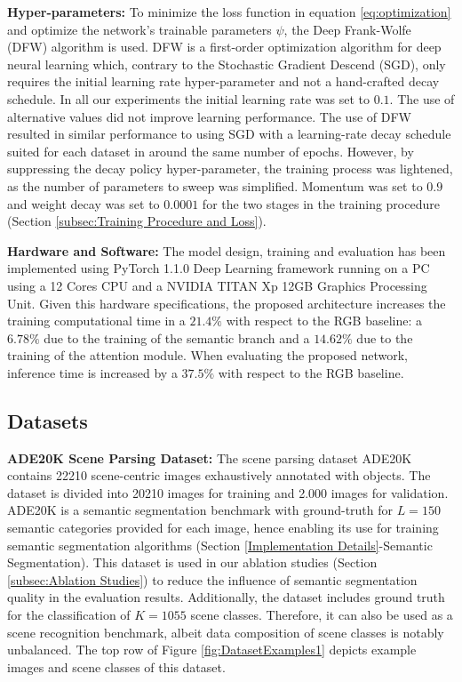\documentclass[review, 3p, sort&compress]{elsarticle}
\begin{document}
\textbf{Hyper-parameters:} To minimize the loss function in equation \ref{eq:optimization} and optimize the network's trainable parameters \(\psi\), the Deep Frank-Wolfe (DFW) \cite{berrada2018deep} algorithm is used. DFW is a first-order optimization algorithm for deep neural learning which, contrary to the Stochastic Gradient Descend (SGD), only requires the initial learning rate hyper-parameter and not a hand-crafted decay schedule. In all our experiments the initial learning rate was set to \(0.1\). The use of alternative values did not improve learning performance. The use of DFW resulted in similar performance to using SGD with a learning-rate decay schedule suited for each dataset in around the same number of epochs. However, by suppressing the decay policy hyper-parameter, the training process was lightened, as the number of parameters to sweep was simplified. Momentum was set to \(0.9\) and weight decay was set to \(0.0001\) for the two stages in the training procedure (Section \ref{subsec:Training Procedure and Loss}).

\textbf{Hardware and Software:} The model design, training and evaluation has been implemented using PyTorch 1.1.0 Deep Learning framework \cite{paszke2017automatic} running on a PC using a 12 Cores CPU and a NVIDIA TITAN Xp 12GB Graphics Processing Unit. Given this hardware specifications, the proposed architecture increases the training computational time in a \(21.4 \%\) with respect to the RGB baseline: a \(6.78 \%\) due to the training of the semantic branch and a \(14.62 \%\) due to the training of the attention module. When evaluating the proposed network, inference time is increased by a \(37.5 \%\) with respect to the RGB baseline.

\subsection{Datasets} \label{Datasets}
\textbf{ADE20K Scene Parsing Dataset:} The scene parsing dataset ADE20K \cite{zhou2017scene} contains 22210 scene-centric images exhaustively annotated with objects. The dataset is divided into 20210 images for training and 2.000 images for validation. ADE20K is a semantic segmentation benchmark with ground-truth for \(L=150\) semantic categories provided for each image, hence enabling its use for training semantic segmentation algorithms (Section \ref{Implementation Details}-Semantic Segmentation). This dataset is used in our ablation studies (Section \ref{subsec:Ablation Studies}) to reduce the influence of semantic segmentation quality in the evaluation results. Additionally, the dataset includes ground truth for the classification of \(K = 1055\) scene classes. Therefore, it can also be used as a scene recognition benchmark, albeit data composition of scene classes is notably unbalanced. The top row of Figure \ref{fig:DatasetExamples1} depicts example images and scene classes of this dataset.
\end{document}
